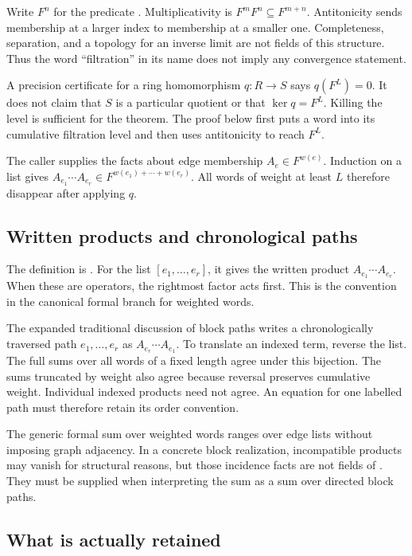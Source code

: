 Write $F^n$ for the predicate . Multiplicativity is $F^mF^n\subseteq F^{m+n}$. Antitonicity sends membership at a larger index to membership at a smaller one. Completeness, separation, and a topology for an inverse limit are not fields of this structure. Thus the word ``filtration'' in its name does not imply any convergence statement.

A precision certificate for a ring homomorphism $q:R\to S$ says $q(F^L)=0$. It does not claim that $S$ is a particular quotient or that $\ker q=F^L$. Killing the level is sufficient for the theorem. The proof below first puts a word into its cumulative filtration level and then uses antitonicity to reach $F^L$.

The caller supplies the facts about edge membership $A_e\in F^{w(e)}$. Induction on a list gives $A_{e_1}\cdots A_{e_r}\in F^{w(e_1)+\cdots+w(e_r)}$. All words of weight at least $L$ therefore disappear after applying $q$.

\subsection{Written products and chronological paths}

The definition  is . For the list $[e_1,\ldots,e_r]$, it gives the written product $A_{e_1}\cdots A_{e_r}$. When these are operators, the rightmost factor acts first. This is the convention in the canonical formal branch for weighted words.

The expanded traditional discussion of block paths writes a chronologically traversed path $e_1,\ldots,e_r$ as $A_{e_r}\cdots A_{e_1}$. To translate an indexed term, reverse the list. The full sums over all words of a fixed length agree under this bijection. The sums truncated by weight also agree because reversal preserves cumulative weight. Individual indexed products need not agree. An equation for one labelled path must therefore retain its order convention.

The generic formal sum over weighted words ranges over edge lists without imposing graph adjacency. In a concrete block realization, incompatible products may vanish for structural reasons, but those incidence facts are not fields of . They must be supplied when interpreting the sum as a sum over directed block paths.

\subsection{What is actually retained}

